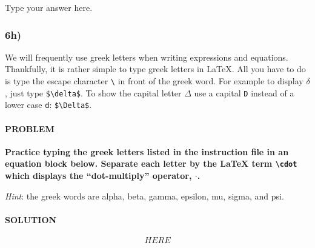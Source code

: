 \documentclass[]{article}
\let\oldparagraph\paragraph
\renewcommand{\paragraph}[1]{\oldparagraph{#1}\mbox{}}
\begin{document}
Type your answer here.

\hypertarget{h}{%
\subsubsection{6h)}\label{h}}

We will frequently use greek letters when writing expressions and
equations. Thankfully, it is rather simple to type greek letters in
LaTeX. All you have to do is type the escape character
\texttt{\textbackslash{}} in front of the greek word. For example to
display \(\delta\), just type \texttt{\$\textbackslash{}delta\$}. To
show the capital letter \(\Delta\) use a capital \texttt{D} instead of a
lower case \texttt{d}: \texttt{\$\textbackslash{}Delta\$}.

\hypertarget{problem-38}{%
\paragraph{PROBLEM}\label{problem-38}}

\textbf{Practice typing the greek letters listed in the instruction file
in an equation block below. Separate each letter by the LaTeX term
\texttt{\textbackslash{}cdot} which displays the ``dot-multiply''
operator, \(\cdot\).}

\emph{Hint}: the greek words are alpha, beta, gamma, epsilon, mu, sigma,
and psi.

\hypertarget{solution-37}{%
\paragraph{SOLUTION}\label{solution-37}}

\[ 
HERE
\]
\end{document}
